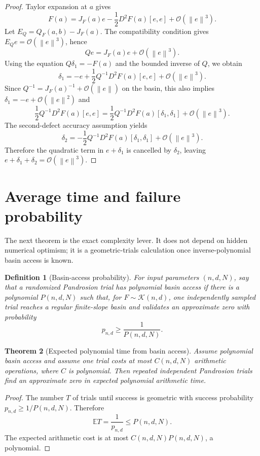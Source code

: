 \documentclass[11pt]{article}
\newtheorem{definition}{Definition}[section]
\newtheorem{theorem}[definition]{Theorem}
\newcommand{\E}{\mathbb E}
\newcommand{\K}{\mathcal K}
\newcommand{\OO}{\mathcal O}
\newcommand{\norm}[1]{\left\lVert #1\right\rVert}
\begin{document}
\begin{proof}
Taylor expansion at $a$ gives
\[
        F(a)=J_F(a)e-\frac12D^2F(a)[e,e]+\OO(\norm e^3).
\]
Let $E_Q=Q_F(a,b)-J_F(a)$.  The compatibility condition gives $E_Qe=\OO(\norm e^3)$, hence
\[
        Qe=J_F(a)e+\OO(\norm e^3).
\]
Using the equation $Q\delta_1=-F(a)$ and the bounded inverse of $Q$, we obtain
\[
        \delta_1=-e+\frac12Q^{-1}D^2F(a)[e,e]+\OO(\norm e^3).
\]
Since $Q^{-1}=J_F(a)^{-1}+\OO(\norm e)$ on the basin, this also implies $\delta_1=-e+\OO(\norm e^2)$ and
\[
        \frac12Q^{-1}D^2F(a)[e,e]
        =\frac12Q^{-1}D^2F(a)[\delta_1,\delta_1]+\OO(\norm e^3).
\]
The second-defect accuracy assumption yields
\[
        \delta_2=-\frac12Q^{-1}D^2F(a)[\delta_1,\delta_1]+\OO(\norm e^3).
\]
Therefore the quadratic term in $e+\delta_1$ is cancelled by $\delta_2$, leaving $e+\delta_1+\delta_2=\OO(\norm e^3)$.
\end{proof}

\section{Average time and failure probability}

The next theorem is the exact complexity lever.  It does not depend on hidden numerical optimism; it is a geometric-trials calculation once inverse-polynomial basin access is known.

\begin{definition}[Basin-access probability]\label{def:access}
For input parameters $(n,d,N)$, say that a randomized Pandrosion trial has polynomial basin access if there is a polynomial $P(n,d,N)$ such that, for $F\sim\K(n,d)$, one independently sampled trial reaches a regular finite-slope basin and validates an approximate zero with probability
\[
        p_{n,d}\ge \frac{1}{P(n,d,N)}.
\]
\end{definition}

\begin{theorem}[Expected polynomial time from basin access]\label{thm:expected}
Assume polynomial basin access and assume one trial costs at most $C(n,d,N)$ arithmetic operations, where $C$ is polynomial.  Then repeated independent Pandrosion trials find an approximate zero in expected polynomial arithmetic time.
\end{theorem}

\begin{proof}
The number $T$ of trials until success is geometric with success probability $p_{n,d}\ge 1/P(n,d,N)$.  Therefore
\[
        \E T=\frac1{p_{n,d}}\le P(n,d,N).
\]
The expected arithmetic cost is at most $C(n,d,N)P(n,d,N)$, a polynomial.
\end{proof}
\end{document}
